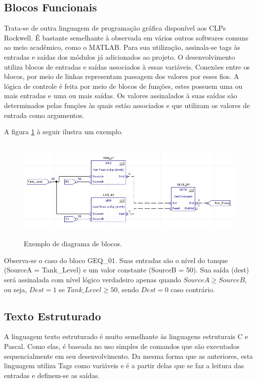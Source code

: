 \subsection{Blocos Funcionais} \label{subsec:blocos}
Trata-se de outra linguagem de programação gráfica disponível aos CLPs Rockwell. É bastante semelhante à observada em vários outros softwares comuns ao meio acadêmico, como o MATLAB. Para sua utilização, assinala-se tags às entradas e saídas dos módulos já adicionados ao projeto. O desenvolvimento utiliza blocos de entradas e saídas associados à essas variáveis. Conexões entre os blocos, por meio de linhas representam passagem dos valores por esses fios. A lógica de controle é feita por meio de blocos de funções, estes possuem uma ou mais entradas e uma ou mais saídas. Os valores assinalados à suas saídas são determinados pelas funções às quais estão associados e que utilizam os valores de entrada como argumentos.

A figura \ref{fig:blocos} à seguir ilustra um exemplo.

\begin{figure}[H]
	\centering
	\includegraphics[height=5cm,keepaspectratio]{figs/blocos.png}
	\caption{Exemplo de diagrama de blocos.}
	\label{fig:blocos}
\end{figure}

Observa-se o caso do bloco GEQ\_01. Suas entradas são o nível do tanque (SourceA = Tank\_Level) e um valor constante (SourceB = 50). Sua saída (dest) será assinalada com nível lógico verdadeiro apenas quando $SourceA \geq SourceB$, ou seja, $Dest=1$ se $Tank\_Level \geq 50$, sendo $Dest = 0$ caso contrário.

\subsection{Texto Estruturado} \label{secTexEst} 
A linguagem texto estruturado é muito semelhante às linguagens estruturais C e Pascal. Como elas, é baseada no uso simples de comandos que são executados sequencialmente em seu desenvolvimento. Da mesma forma que as anteriores, esta linguagem utiliza Tags como variáveis e é a partir delas que se faz a leitura das entradas e definem-se as saídas. 

